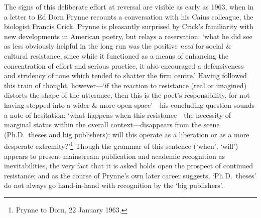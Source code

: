 \documentclass[]{article}
\begin{document}
The signs of this deliberate effort at reversal are visible as early as
1963, when in a letter to Ed Dorn Prynne recounts a conversation with
his Caius colleague, the biologist Francis Crick. Prynne is pleasantly
surprised by Crick’s familiarity with new developments in American
poetry, but relays a reservation: ‘what he did see as less obviously
helpful in the long run was the positive \emph{need} for social \&
cultural resistance, since while it functioned as a means of enhancing
the concentration of effort and serious practice, it also encouraged a
defensiveness and stridency of tone which tended to shatter the firm
centre.’ Having followed this train of thought, however—‘if the reaction
to resistance (real or imagined) distorts the shape of the utterance,
then this is the poet’s responsibility, for not having stepped into a
wider \& more open space’—his concluding question sounds a note of
hesitation: ‘what happens when this resistance—the necessity of marginal
status within the overall context—disappears from the scene
(Ph.D.~theses and big publishers): will this operate as a liberation or
as a more desperate extremity?’\footnote{Prynne to Dorn, 22 January
  1963.} Though the grammar of this sentence (‘when’, ‘will’) appears to
present mainstream publication and academic recognition as
inevitabilities, the very fact that it is asked holds open the prospect
of continued resistance; and as the course of Prynne’s own later career
suggests, ‘Ph.D.~theses’ do not always go hand-in-hand with recognition
by the ‘big publishers’.
\end{document}
